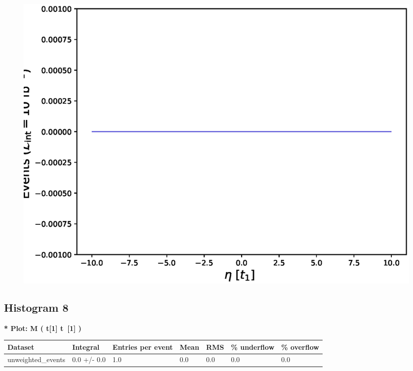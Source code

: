 \documentclass[a4paper, 10pt]{article}
\begin{document}
\begin{figure}[H]
  \begin{center}
    \includegraphics[scale=0.45]{selection_6.eps}\\
\caption{   }
  \end{center}
\end{figure}
      \newpage
\subsection{ Histogram 8}

\textbf{* Plot: M ( t[1] t~[1] ) }\\
   \begin{table}[H]
  \begin{center}
    \begin{tabular}{|m{23.0mm}|m{23.0mm}|m{18.0mm}|m{19.0mm}|m{19.0mm}|m{19.0mm}|m{19.0mm}|}
      \hline
      {\cellcolor{yellow}         Dataset}& {\cellcolor{yellow}         Integral}& {\cellcolor{yellow}         Entries per event}& {\cellcolor{yellow}         Mean}& {\cellcolor{yellow}         RMS}& {\cellcolor{yellow}         \% underflow}& {\cellcolor{yellow}         \% overflow}\\
      \hline
      {\cellcolor{white}         unweighted\_events}& {\cellcolor{white}         0.0 +/\-- 0.0}& {\cellcolor{white}         1.0}& {\cellcolor{white}         0.0}& {\cellcolor{white}         0.0}& {\cellcolor{green}         0.0}& {\cellcolor{green}         0.0}\\
\hline
    \end{tabular}
  \end{center}
\end{table}
\end{document}
